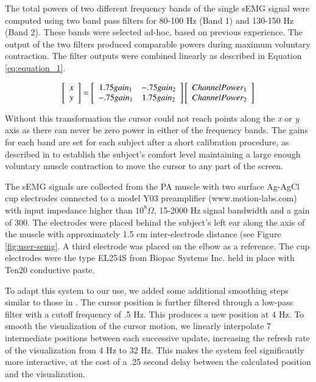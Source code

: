 The total powers of two different frequency bands of the single sEMG signal were computed using two band pass filters for 80-100 Hz (Band 1) and 130-150 Hz (Band 2). These bands were selected ad-hoc, based on previous experience. The output of the two filters produced comparable powers during maximum voluntary contraction. The filter outputs were combined linearly as described in Equation \ref{eq:equation_1}. 


\begin{equation}
\centering
\left[ \begin{array}{c} x\\ y \end{array} \right] = \left[\begin{array}{c c} 1.75 gain_1 & -.75 gain_2 \\ -.75gain_{1} &  1.75gain_{2}\end{array} \right]\left[\begin{array}{c}ChannelPower_1 \\ ChannelPower_2\end{array}\right]
	\label{eq:equation_1}
\end{equation}


Without this transformation the cursor could not reach points along the \emph{x} or \emph{y} axis as there can never be zero power in either of the frequency bands. The gains for each band are set for each subject after a short calibration procedure, as described in \cite{JoshiTwoDimCursor} to establish the subject’s comfort level maintaining a large enough voluntary muscle contraction to move the cursor to any part of the screen.

The sEMG signals are collected from the PA muscle with two surface Ag-AgCl cup electrodes connected to a model Y03 preamplifier (www.motion-labs.com) with input impedance higher than $10^{8} \Omega$, 15-2000 Hz signal bandwidth and a gain of 300. The electrodes were placed behind the subject’s left ear along the axis of the muscle with approximately 1.5 cm inter-electrode distance (see Figure \ref{fig:user-semg}. A third electrode was placed on the elbow as a reference. The cup electrodes were the type EL254S from Biopac Systems Inc. held in place with Ten20 conductive paste. 

To adapt this system to our use, we added some additional smoothing steps similar to those in \cite{vernon2011}. The cursor position is further filtered through a low-pass filter with a cutoff frequency of .5 Hz. This produces a new position at 4 Hz. To smooth the visualization of the cursor motion, we linearly interpolate 7 intermediate positions between each successive update, increasing the refresh rate of the visualization from 4 Hz to 32 Hz. This makes the system feel significantly more interactive, at the cost of a .25 second delay between the calculated position and the visualization.

